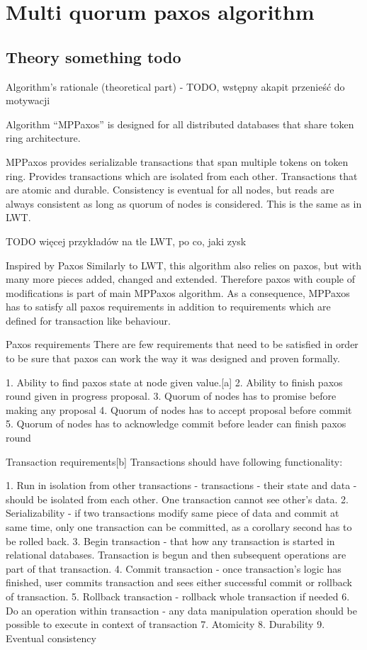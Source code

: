 \chapter{Multi quorum paxos algorithm}\label{chapter:algo}

\section{Theory something todo}


Algorithm’s rationale (theoretical part) - TODO, wstępny akapit przenieść do motywacji


Algorithm “MPPaxos” is designed for all distributed databases that share token ring architecture. 


MPPaxos provides serializable transactions that span multiple tokens on token ring. Provides transactions which are isolated from each other. Transactions that are atomic and durable. 
Consistency is eventual for all nodes, but reads are always consistent as long as quorum of nodes is considered. This is the same as in LWT.


TODO więcej przykładów na tle LWT, po co, jaki zysk


        Inspired by Paxos
Similarly to LWT, this algorithm also relies on paxos, but with many more pieces added, changed and extended. 
Therefore paxos with couple of modifications is part of main MPPaxos algorithm. As a consequence, MPPaxos has to satisfy all paxos requirements in addition to requirements which are defined for transaction like behaviour.         


        Paxos requirements
There are few requirements that need to be satisfied in order to be sure that paxos can work the way it was designed and proven formally. 


1. Ability to find paxos state at node given value.[a]
2. Ability to finish paxos round given in progress proposal.
3. Quorum of nodes has to promise before making any proposal
4. Quorum of nodes has to accept proposal before commit
5. Quorum of nodes has to acknowledge commit before leader can finish paxos round


        Transaction requirements[b]
Transactions should have following functionality:


1. Run in isolation from other transactions - transactions - their state and data - should be isolated from each other. One transaction cannot see other’s data.
2. Serializability - if two transactions modify same piece of data and commit at same time, only one transaction can be committed, as a corollary second has to be rolled back.
3. Begin transaction - that how any transaction is started in relational databases. Transaction is begun and then subsequent operations are part of that transaction.
4. Commit transaction - once transaction’s logic has finished, user commits transaction and sees either successful commit or rollback of transaction. 
5. Rollback transaction - rollback whole transaction if needed
6. Do an operation within transaction - any data manipulation operation should be possible to execute in context of transaction
7. Atomicity
8. Durability
9. Eventual consistency


